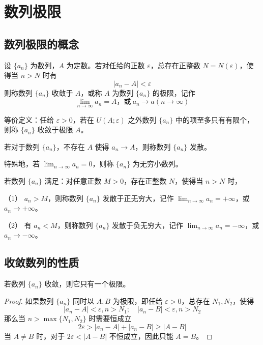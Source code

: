 \chapter{数列极限}

\section{数列极限的概念}

\begin{definition}
	设 $\{a_n\}$ 为数列，$A$ 为定数。若对任给的正数 $\varepsilon$，总存在正整数 $N=N(\varepsilon)$，使得当 $n>N$ 时有
	$$|a_n - A| < \varepsilon$$
	则称数列 $\{a_n\}$ 收敛于 $A$，或称 $A$ 为数列 $\{a_n\}$ 的极限，记作
	$$\displaystyle\lim_{n\to \infty} a_n = A \text{，或}\ a_n \to a(n \to \infty)$$
\end{definition}

等价定义：任给 $\varepsilon > 0$，若在 $U(A;\varepsilon)$ 之外数列 $\{a_n\}$ 中的项至多只有有限个，则称 $\{a_n\}$ 收敛于极限 $A$。

若对于数列 $\{a_n\}$，不存在 $A$ 使得 $a_n\to A$，则称数列 $\{a_n\}$ 发散。

特殊地，若 $\displaystyle\lim_{n\to \infty} a_n = 0$，则称 $\{a_n\}$ 为无穷小数列。

\begin{definition}[无穷大数列]
	若数列 $\{a_n\}$ 满足：对任意正数 $M>0$，存在正整数 $N$，使得当 $n>N$ 时，

	（1） $a_n>M$，则称数列 $\{a_n\}$ 发散于正无穷大，记作 $\displaystyle\lim_{n\to \infty} a_n = +\infty$，或 $a_n \to +\infty$。

	（2） 有 $a_n<M$，则称数列 $\{a_n\}$ 发散于负无穷大，记作 $\displaystyle\lim_{n\to \infty} a_n = -\infty$，或 $a_n \to -\infty$。
\end{definition}

\section{收敛数列的性质}

\begin{theorem}[唯一性]
	若数列 $\{a_n\}$ 收敛，则它只有一个极限。
\end{theorem}

\begin{proof}
	如果数列 $\{a_n\}$ 同时以 $A,B$ 为极限，即任给 $\varepsilon>0$，总存在 $N_1,N_2$，使得
	$$|a_n-A|<\varepsilon,n>N_1;\quad |a_n-B|<\varepsilon,n>N_2$$
	那么当 $n>\max\{N_1,N_2\}$ 时需要恒成立
	$$2\varepsilon > |a_n-A|+|a_n-B| \geqslant |A-B|$$
	当 $A\ne B$ 时，对于 $2\varepsilon <|A-B|$ 不恒成立，因此只能 $A=B$。
\end{proof}

